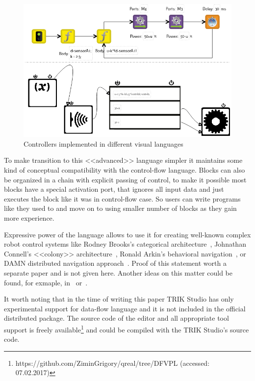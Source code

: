\documentclass[conference]{IEEEtran}
\begin{document}
\begin{figure}[ht]
    \centering
    \includegraphics[width=\columnwidth]{TS_AlongTheBox_Comparison.png}
    \caption{Controllers implemented in different visual languages}
    \label{image:alongTheBox_CF_DF}
\end{figure}

To make transition to this <<advanced>> language simpler it maintains some kind of conceptual compatibility with the control-flow language. Blocks can also be organized in a chain with explicit passing of control, to make it possible most blocks have a special activation port, that ignores all input data and just executes the block like it was in control-flow case. So users can write programs like they used to and move on to using smaller number of blocks as they gain more experience.

Expressive power of the language allows to use it for creating well-known complex robot control systems like Rodney Brooks's categorical architecture~\cite{brooks1986robust}, Johnathan Connell's <<colony>> architecture~\cite{connell1989colony}, Ronald Arkin's behavioral navigation~\cite{arkin1987motor}, or DAMN distributed navigation approach~\cite{rosenblatt1997damn}. Proof of this statement worth a separate paper and is not given here. Another ideas on this matter could be found, for exmaple, in~\cite{simpson2009toward} or~\cite{banyasad2000visual}.

It worth noting that in the time of writing this paper TRIK Studio has only experimental support for data-flow language and it is not included in the official distributed package. The source code of the editor and all appropriate tool support is freely available\footnote{https://github.com/ZiminGrigory/qreal/tree/DFVPL (accessed: 07.02.2017)} and could be compiled with the TRIK Studio's source code.
\end{document}
